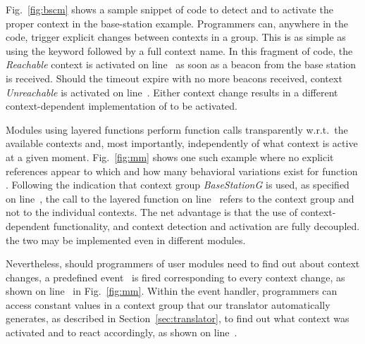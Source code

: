 Fig.~\ref{fig:bscm} shows a sample snippet of code to detect and to
activate the proper context in the base-station example. Programmers
can, anywhere in the code, trigger explicit changes between contexts
in a group. This is as simple as using the  keyword
followed by a full context name. In this fragment of code, the
\emph{Reachable} context is activated on line~ as soon
as a beacon from the base station is received. Should the timeout
expire with no more beacons received, context \emph{Unreachable} is
activated on line~. Either context change results in a
different context-dependent implementation of  to be
activated.


Modules using layered functions perform function calls transparently
w.r.t.\ the available contexts and, most importantly, independently of
what context is active at a given moment. Fig.~\ref{fig:mm} shows one
such example where no explicit references appear to which and how many
behavioral variations exist for function . Following the
indication that context group \emph{BaseStationG} is used, as
specified on line~, the call to the layered function
 on line~ refers to the context group and
not to the individual contexts. The net advantage is that the use of
context-dependent functionality, and context detection and activation
are fully decoupled. the two may be implemented even in different
modules.


Nevertheless, should programmers of user modules need to find out
about context changes, a predefined event~ is
fired corresponding to every context change, as shown on
line~ in Fig.~\ref{fig:mm}. %
Within the event handler, programmers can access constant values in a
context group that our translator automatically generates, as
described in Section~\ref{sec:translator}, to find out what context
was activated and to react accordingly, as shown on
line~.



